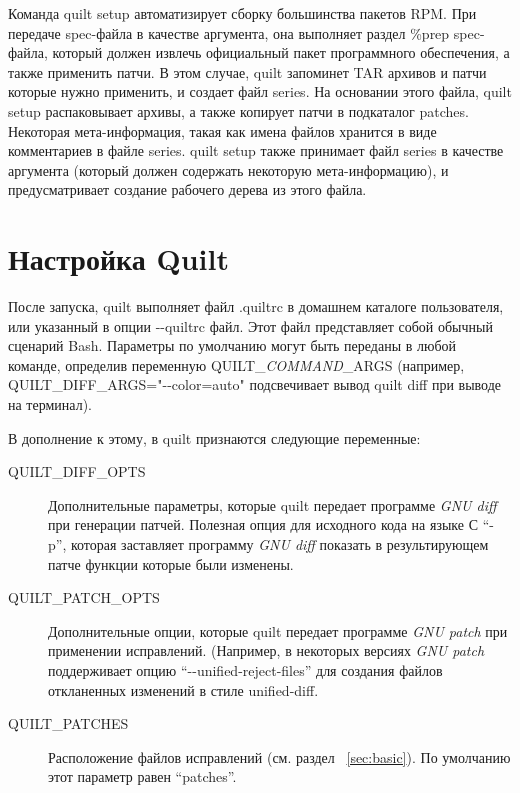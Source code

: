 \documentclass{article}
\newcommand{\quilt}[1]{\textsf{quilt #1}}
\newcommand{\prog}[1]{\textit{#1}}
\begin{document}
Команда \quilt{setup} автоматизирует сборку большинства пакетов RPM. При передаче spec-файла в качестве аргумента, она выполняет раздел \textsf{\%prep} spec-файла, который должен извлечь официальный пакет программного обеспечения, а также применить патчи. В этом случае, quilt запоминет TAR архивов и патчи которые нужно применить, и создает файл \textsf{series}. На основании этого файла, \quilt{setup} распаковывает архивы, а также копирует патчи в подкаталог \textsf{patches}. Некоторая мета-информация, такая как имена файлов хранится в виде комментариев в файле \textsf{series}. \quilt{setup} также принимает файл \textsf{series} в качестве аргумента (который должен содержать некоторую мета-информацию), и предусматривает создание рабочего дерева из этого файла.

\section{Настройка Quilt}

После запуска, quilt выполняет файл \textsf{.quiltrc} в домашнем каталоге пользователя, или указанный в опции \textsf{-{}-quiltrc} файл. Этот файл представляет собой обычный сценарий Bash. Параметры по умолчанию могут быть переданы в любой команде, определив переменную \textsf{QUILT\_\textit{COMMAND}\_ARGS} (например,  \textsf{QUILT\_DIFF\_ARGS="-{}-color=auto"} подсвечивает вывод \quilt{diff} при выводе на терминал).

В дополнение к этому, в quilt признаются следующие переменные:

\begin{description}

\item[\textsf{QUILT\_DIFF\_OPTS}]
Дополнительные параметры, которые quilt передает программе \prog{GNU diff} при генерации патчей. Полезная опция для исходного кода на языке С ``\textsf{-p}'', которая заставляет программу \prog{GNU diff} показать в результирующем патче функции которые были изменены.

\item[\textsf{QUILT\_PATCH\_OPTS}]
Дополнительные опции, которые quilt передает программе   \prog{GNU patch} при применении исправлений. (Например, в некоторых версиях \prog{GNU patch} поддерживает опцию ``\textsf{-{}-unified-reject-files}'' для создания файлов откланенных изменений в стиле unified-diff.

\item[\textsf{QUILT\_PATCHES}]
Расположение файлов исправлений (см. раздел ~\ref{sec:basic}). По умолчанию этот параметр равен ``\textsf{patches}''.

\end{description}
\end{document}
